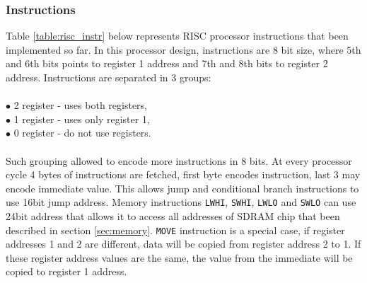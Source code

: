 \documentclass[a4paper,12pt]{article}
\begin{document}
\begin{multicols}{2}
\subsubsection{Instructions}\label{sec:instr}
Table \ref{table:risc_instr} below represents RISC processor instructions that been implemented so far. In this processor design, instructions are 8 bit size, where 5th and 6th bits points to register 1 address and 7th and 8th bits to register 2 address. Instructions are separated in 3 groups:\\\\
$\bullet$ 2 register - uses both registers,\\
$\bullet$ 1 register - uses only register 1,\\
$\bullet$ 0 register - do not use registers.\\\\
Such grouping allowed to encode more instructions in 8 bits. At every processor cycle 4 bytes of instructions are fetched, first byte encodes instruction, last 3 may encode immediate value. This allows jump and conditional branch instructions to use 16bit jump address. Memory instructions \texttt{LWHI}, \texttt{SWHI},  \texttt{LWLO} and \texttt{SWLO} can use 24bit address that allows it to access all addresses of SDRAM chip that been described in section \ref{sec:memory}. \texttt{MOVE} instruction is a special case, if register addresses 1 and 2 are different, data will be copied from register address 2 to 1. If these register address values are the same, the value from the immediate will be copied to register 1 address.

\end{multicols}
\end{document}
